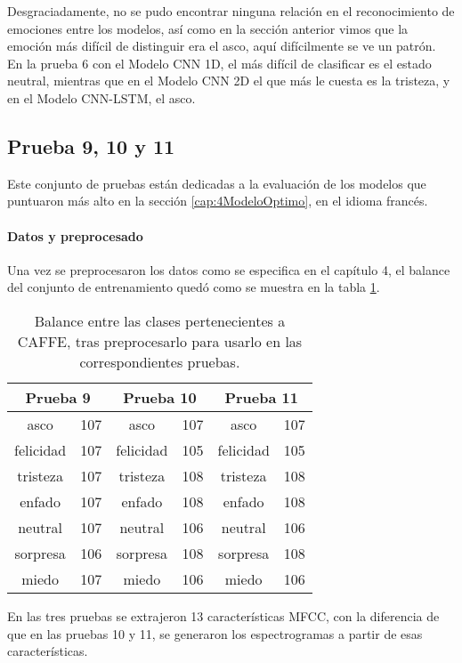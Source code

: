\documentclass[11pt,a4paper,spanish]{book}
\begin{document}
	Desgraciadamente, no se pudo encontrar ninguna relación en el reconocimiento de emociones entre los modelos, así como en la sección anterior vimos que la emoción más difícil de distinguir era el asco, aquí difícilmente se ve un patrón.\\
	En la prueba 6 con el Modelo CNN 1D, el más difícil de clasificar es el estado neutral, mientras que en el Modelo CNN 2D el que más le cuesta es la tristeza, y en el Modelo CNN-LSTM, el asco.
	
	\subsection{Prueba 9, 10 y 11}
	Este conjunto de pruebas están dedicadas a la evaluación de los modelos que puntuaron más alto en la sección \ref{cap:4ModeloOptimo}, en el idioma francés.
	\paragraph{Datos y preprocesado}
	Una vez se preprocesaron los datos como se especifica en el capítulo 4, el balance del conjunto de entrenamiento quedó como se muestra en la tabla \ref{ref:balanceTest91011}.
	\begin{table}[H]
		\centering
		\begin{center}
			\begin{tabular}{ c  c | c  c |c  c }
				\multicolumn{2}{c|}{Prueba 9} &
				\multicolumn{2}{|c|}{Prueba 10} &
				\multicolumn{2}{|c}{Prueba 11} \\
				\hline
				asco 		& 107 & asco 		& 107 & asco 	  & 107	\\
				felicidad 	& 107 & felicidad 	& 105 & felicidad & 105	\\
				tristeza 	& 107 & tristeza 	& 108 & tristeza  & 108	\\
				enfado 		& 107 & enfado 		& 108 & enfado 	  & 108	\\
				neutral 	& 107 & neutral 	& 106 & neutral   & 106	\\
				sorpresa 	& 106 & sorpresa 	& 108 & sorpresa  & 108 \\
				miedo 		& 107 & miedo		& 106 & miedo 	  & 106 \\
				\hline
			\end{tabular}
			
			\caption{Balance entre las clases pertenecientes a CAFFE, tras preprocesarlo para usarlo en las correspondientes pruebas.}
			\label{ref:balanceTest91011}
		\end{center}
	\end{table}
	En las tres pruebas se extrajeron 13 características MFCC, con la diferencia de que en las pruebas 10 y 11, se generaron los espectrogramas a partir de esas características.
	
\end{document}
